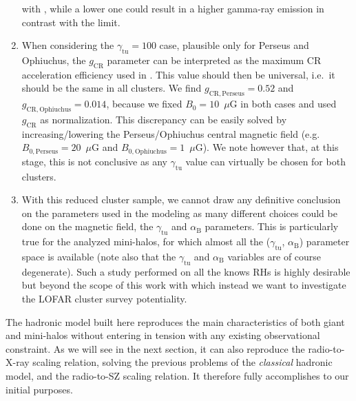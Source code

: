 \documentclass[traditabstract]{aa}
\newcommand{\rmn}{\mathrm}
\begin{document}
\begin{enumerate}
       with \cite{2010A&A...513A..30B}, while a lower one could result in a higher gamma-ray emission in 
       contrast with the \cite{2012AAS...21920701Z} limit.
 \item When considering the $\gamma_{\rmn{tu}}=100$ case, plausible only for Perseus and Ophiuchus, the $g_{\rmn{CR}}$ parameter can be interpreted as the maximum
       CR acceleration efficiency used in \cite{2010MNRAS.409..449P}. This value should then be universal, i.e.~it should be the same in all clusters. We find 
       $g_{\rmn{CR, Perseus}} = 0.52$ and $g_{\rmn{CR, Ophiuchus}} = 0.014$, because we fixed $B_{0}=10$~$\mu$G in both cases and used $g_{\rmn{CR}}$ 
       as normalization. This discrepancy can be easily solved by increasing/lowering the Perseus/Ophiuchus central magnetic field (e.g.~$B_{0,\rmn{Perseus}}=20$~$\mu$G 
       and $B_{0,\rmn{Ophiuchus}}=1$~$\mu$G). We note however that, at this stage, this is not conclusive as any $\gamma_{\rmn{tu}}$ value can 
       virtually be chosen for both clusters. 
 \item With this reduced cluster sample, we cannot draw any definitive conclusion on the parameters used in the modeling as many different choices could be done on
       the magnetic field, the $\gamma_{\rmn{tu}}$ and $\alpha_{\rmn{B}}$ parameters. This is particularly true for the analyzed mini-halos, for which almost all the
       ($\gamma_{\rmn{tu}}$, $\alpha_{\rmn{B}}$) parameter space is available (note also that the $\gamma_{\rmn{tu}}$ and $\alpha_{\rmn{B}}$ variables are of course degenerate). 
       Such a study performed on all the knows RHs is highly desirable but beyond the scope of this work with which instead we 
       want to investigate the LOFAR cluster survey potentiality.
\end{enumerate}

The hadronic model built here reproduces the main characteristics of both giant and mini-halos without entering in tension with any existing observational constraint. As we will see in the next section, it can also reproduce the radio-to-X-ray scaling relation, solving the previous problems of the \emph{classical} hadronic model, and the radio-to-SZ scaling relation. It therefore fully accomplishes to our initial purposes.
\end{document}
